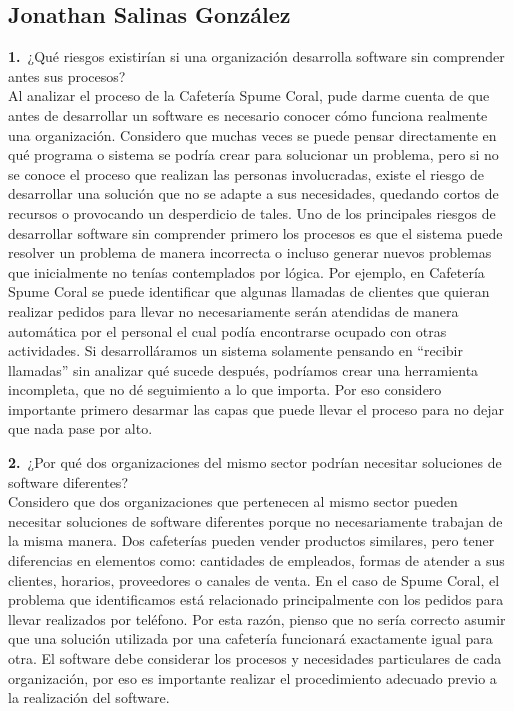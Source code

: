 \documentclass[12pt,letterpaper]{article}
\newcommand{\negr}[1]{\textsf{\bfseries\color{verde} #1}}
\begin{document}
\subsection{Jonathan Salinas González}
\noindent\negr{1.}\ ¿Qué riesgos existirían si una organización desarrolla software sin comprender antes sus procesos?\\
Al analizar el proceso de la Cafetería Spume Coral, pude darme cuenta de que antes de desarrollar un software es necesario conocer cómo funciona realmente una organización. Considero que muchas veces se puede pensar directamente en qué programa o sistema se podría crear para solucionar un problema, pero si no se conoce el proceso que realizan las personas involucradas, existe el riesgo de desarrollar una solución que no se adapte a sus necesidades, quedando cortos de recursos o provocando un desperdicio de tales. Uno de los principales riesgos de desarrollar software sin comprender primero los procesos es que el sistema puede resolver un problema de manera incorrecta o incluso generar nuevos problemas que inicialmente no tenías contemplados por lógica. Por ejemplo, en Cafetería Spume Coral se puede identificar que algunas llamadas de clientes que quieran realizar pedidos para llevar no necesariamente serán atendidas de manera automática por el personal el cual podía encontrarse ocupado con otras actividades. Si desarrolláramos un sistema solamente pensando en ``recibir llamadas'' sin analizar qué sucede después, podríamos crear una herramienta incompleta, que no dé seguimiento a lo que importa. Por eso considero importante primero desarmar las capas que puede llevar el proceso para no dejar que nada pase por alto.

\vspace{0.4cm}
\noindent\negr{2.}\ ¿Por qué dos organizaciones del mismo sector podrían necesitar soluciones de software diferentes?\\
Considero que dos organizaciones que pertenecen al mismo sector pueden necesitar soluciones de software diferentes porque no necesariamente trabajan de la misma manera. Dos cafeterías pueden vender productos similares, pero tener diferencias en elementos como: cantidades de empleados, formas de atender a sus clientes, horarios, proveedores o canales de venta. En el caso de Spume Coral, el problema que identificamos está relacionado principalmente con los pedidos para llevar realizados por teléfono. Por esta razón, pienso que no sería correcto asumir que una solución utilizada por una cafetería funcionará exactamente igual para otra. El software debe considerar los procesos y necesidades particulares de cada organización, por eso es importante realizar el procedimiento adecuado previo a la realización del software.
\end{document}

